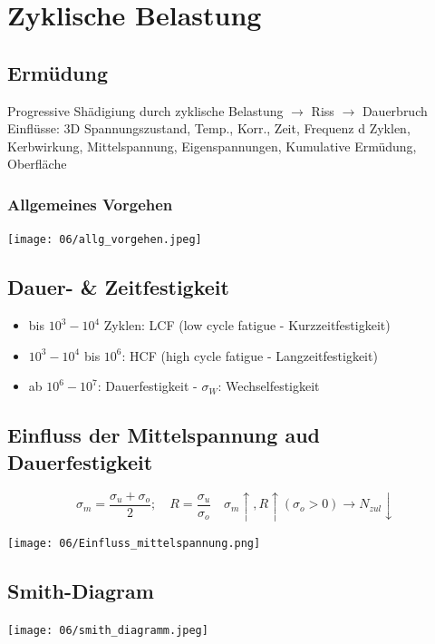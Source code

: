 \section{Zyklische Belastung}
    \subsection{Ermüdung}
        Progressive Shädigiung durch zyklische Belastung $\rightarrow$ Riss $\rightarrow$ Dauerbruch\\
        Einflüsse: 3D Spannungszustand, Temp., Korr., Zeit, Frequenz d Zyklen, Kerbwirkung, Mittelspannung, Eigenspannungen, Kumulative Ermüdung, Oberfläche
        \subsubsection{Allgemeines Vorgehen}
            \texttt{[image: 06/allg\_vorgehen.jpeg]}
        \subsection{Dauer- \& Zeitfestigkeit}
            \begin{minipage}{\linewidth}
                \begin{itemize}
                    \item bis $10^3-10^4$ Zyklen: LCF (low cycle fatigue - Kurzzeitfestigkeit)
                    \item $10^3-10^4$ bis $10^6$: HCF (high cycle fatigue - Langzeitfestigkeit)
                    \item ab $10^6-10^7$: Dauerfestigkeit - $\sigma_W$: Wechselfestigkeit
                \end{itemize}
            \end{minipage}
    \subsection{Einfluss der Mittelspannung aud Dauerfestigkeit}
        \vspace{-3mm}
        \[\sigma_m=\frac{\sigma_u+\sigma_o}{2}; \quad R=\frac{\sigma_u}{\sigma_o} \quad \sigma_m \uparrow, R \uparrow (\sigma_o >0) \rightarrow N_{zul} \downarrow\]
        \begin{center}
            \vspace{-2mm}
            \texttt{[image: 06/Einfluss\_mittelspannung.png]}
        \end{center}
    \subsection{Smith-Diagram}
        \texttt{[image: 06/smith\_diagramm.jpeg]}
        \vspace{-2mm}
